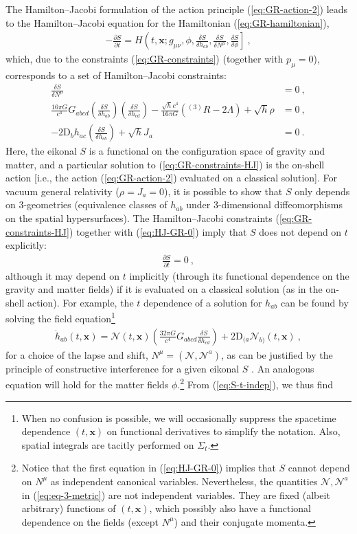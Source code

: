 \documentclass[12pt]{iopart}
\def\eq#1{\begin{equation}\begin{aligned}#1\end{aligned}\end{equation}}
\def\eref#1{(\ref{eq:#1})}
\def\del#1#2{\frac{\partial#1}{\partial#2}}
\def\N{\mathcal{N}}
\def\x{\mathbf{x}}
\begin{document}
The Hamilton--Jacobi formulation of the action principle \eref{GR-action-2} leads to the Hamilton--Jacobi equation for the Hamiltonian \eref{GR-hamiltonian},
\eq{\label{eq:HJ-GR-0}
-\del{S}{t} = H\left(t,\x;g_{\mu\nu},\phi,\frac{\delta S}{\delta h_{ab}},\frac{\delta S}{\delta N^{\mu}},\frac{\delta S}{\delta \phi}\right] \ , 
}
which, due to the constraints \eref{GR-constraints} (together with $p_{\mu}=0$), corresponds to a set of Hamilton--Jacobi constraints:
\eq{\label{eq:GR-constraints-HJ}
\frac{\delta S}{\delta N^{\mu}} &=0 \ , \\
\frac{16\pi G}{c^4} G_{abcd}\left(\frac{\delta S}{\delta h_{ab}}\right)\left(\frac{\delta S}{\delta h_{cd}}\right)-\frac{\sqrt{h}c^4}{16\pi G}\left(^{(3)}R-2\Lambda\right)+\sqrt{h}\rho &= 0\ , \\
-2\mathrm{D}_b h_{ac}\left(\frac{\delta S}{\delta h_{cb}}\right)+\sqrt{h}J_a &= 0 \ .
}
Here, the eikonal $S$ is a functional on the configuration space of gravity and matter, and a particular solution to \eref{GR-constraints-HJ} is the on-shell action [i.e., the action \eref{GR-action-2} evaluated on a classical solution]. For vacuum general relativity ($\rho=J_a=0$), it is possible to show  \citep{Gerlach:1969ph} that $S$ only depends on $3$-geometries (equivalence classes of $h_{ab}$ under $3$-dimensional diffeomorphisms on the spatial hypersurfaces). The Hamilton--Jacobi constraints \eref{GR-constraints-HJ} together with \eref{HJ-GR-0} imply that $S$ does not depend on $t$ explicitly:
\eq{\label{eq:S-t-indep}
\del{S}{t} = 0 \ ,
}
although it may depend on $t$ implicitly (through its functional dependence on the gravity and matter fields) if it is evaluated on a classical solution (as in the on-shell action). For example, the $t$ dependence of a solution for $h_{ab}$ can be found by solving the field equation\footnote{When no confusion is possible, we will occasionally suppress the spacetime dependence $(t,\x)$ on functional derivatives to simplify the notation. Also, spatial integrals are tacitly performed on $\Sigma_t$.}
\eq{\label{eq:eq-3-metric}
\dot{h}_{ab}(t,\x) = \N(t,\x)\left(\frac{32\pi G}{c^4}G_{abcd}\frac{\delta S}{\delta h_{cd}}\right)+2\mathrm{D}_{(a}\N_{b)}(t,\x) \ ,
}
for a choice of the lapse and shift, $N^{\mu} = (\N,\N^a)$, as can be justified by the principle of constructive interference for a given eikonal $S$ \citep{Gerlach:1969ph}. An analogous equation will hold for the matter fields $\phi$.\footnote{Notice that the first equation in \eref{HJ-GR-0} implies that $S$ cannot depend on $N^{\mu}$ as independent canonical variables. Nevertheless, the quantities $\N, \N^a$ in \eref{eq-3-metric} are not independent variables. They are fixed (albeit arbitrary) functions of $(t,\x)$, which possibly also have a functional dependence on the fields (except $N^{\mu}$) and their conjugate momenta.} From \eref{S-t-indep}, we thus find
\end{document}

